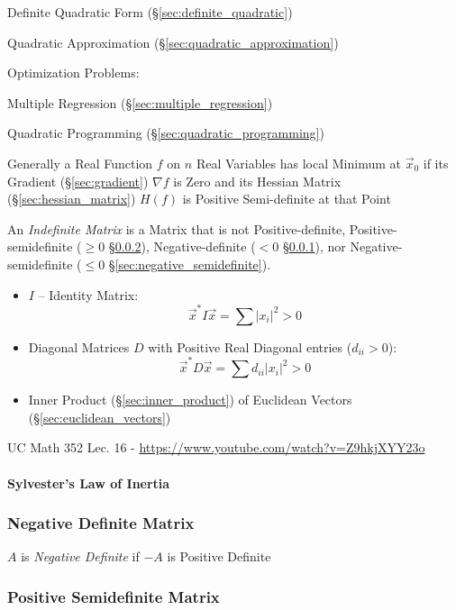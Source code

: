 \fist Definite Quadratic Form (\S\ref{sec:definite_quadratic})

\fist Quadratic Approximation (\S\ref{sec:quadratic_approximation})

Optimization Problems:

\fist Multiple Regression (\S\ref{sec:multiple_regression})

\fist Quadratic Programming (\S\ref{sec:quadratic_programming})

Generally a Real Function $f$ on $n$ Real Variables has local Minimum at
$\vec{x}_0$ if its Gradient (\S\ref{sec:gradient}) $\nabla f$ is Zero and its
Hessian Matrix (\S\ref{sec:hessian_matrix}) $H(f)$ is Positive Semi-definite at
that Point

An \emph{Indefinite Matrix} is a Matrix that is not Positive-definite,
Positive-semidefinite ($\geq 0$ \S\ref{sec:positive_semidefinite}),
Negative-definite ($< 0$ \S\ref{sec:negative_definite}), nor
Negative-semidefinite ($\leq 0$ \S\ref{sec:negative_semidefinite}).

\begin{itemize}
  \item $I$ -- Identity Matrix:
    \[
      \vec{x}^*I\vec{x} = \sum |x_i|^2 > 0
    \]
  \item Diagonal Matrices $D$ with Positive Real Diagonal entries ($d_{ii} >
    0$):
    \[
      \vec{x}^*D\vec{x} = \sum d_{ii}|x_i|^2 > 0
    \]
  \item Inner Product (\S\ref{sec:inner_product}) of Euclidean Vectors
    (\S\ref{sec:euclidean_vectors})
\end{itemize}


UC Math 352 Lec. 16 - \url{https://www.youtube.com/watch?v=Z9hkjXYY23o}



\paragraph{Sylvester's Law of Inertia}\label{sec:sylversters_law}\hfill



\subsubsection{Negative Definite Matrix}\label{sec:negative_definite}

$A$ is \emph{Negative Definite} if $-A$ is Positive Definite



\subsubsection{Positive Semidefinite Matrix}\label{sec:positive_semidefinite}

